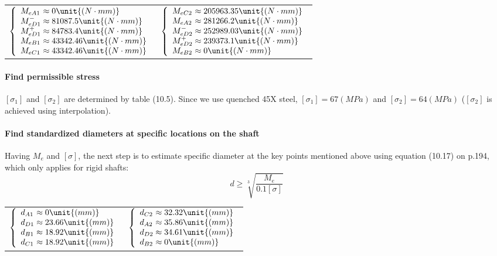 \begin{tabular}{p{7cm}p{7cm}}
	$
	\left\{ 
	\begin{array}{l@{{} \approx {}}l}
	M_{eA1} & 0 \unit{(N\cdot mm)}\\
	M_{eD1}^- & 81087.5 \unit{(N\cdot mm)}\\
	M_{eD1}^+ & 84783.4 \unit{(N\cdot mm)}\\
	M_{eB1} & 43342.46 \unit{(N\cdot mm)}\\
	M_{eC1} & 43342.46 \unit{(N\cdot mm)}\\
	\end{array}
	\right.
	$ &
	$
	\left\{ 
	\begin{array}{l@{{} \approx {}}l}
	M_{eC2} & 205963.35 \unit{(N\cdot mm)}\\
	M_{eA2} & 281266.2 \unit{(N\cdot mm)}\\
	M_{eD2}^- & 252989.03 \unit{(N\cdot mm)}\\
	M_{eD2}^+ & 239373.1 \unit{(N\cdot mm)}\\
	M_{eB2} & 0 \unit{(N\cdot mm)}\\
	\end{array}
	\right.
	$
\end{tabular}\vskip2mm

\paragraph{Find permissible stress}
$ [\sigma_1] $ and $ [\sigma_2] $ are determined by table (10.5). Since we use quenched 45X steel, $ [\sigma_1] = 67 \unit{(MPa)}$ and $ [\sigma_2] = 64 \unit{(MPa)}$ ($ [\sigma_2] $ is achieved using interpolation).

\paragraph{Find standardized diameters at specific locations on the shaft} Having $ M_e $ and $ [\sigma] $, the next step is to estimate specific diameter at the key points mentioned above using equation (10.17) on p.194, which only applies for rigid shafts:
\[d \geq \sqrt[3]{\dfrac{M_e}{0.1[\sigma]}}\]

\begin{tabular}{p{7cm}p{7cm}}
	$
	\left\{ 
	\begin{array}{l@{{} \approx {}}l}
	d_{A1} & 0 \unit{(mm)}\\
	d_{D1} & 23.66 \unit{(mm)}\\
	d_{B1} & 18.92 \unit{(mm)}\\
	d_{C1} & 18.92 \unit{(mm)}\\
	\end{array}
	\right.
	$ &
	$
	\left\{ 
	\begin{array}{l@{{} \approx {}}l}
	d_{C2} & 32.32 \unit{(mm)}\\
	d_{A2} & 35.86 \unit{(mm)}\\
	d_{D2} & 34.61 \unit{(mm)}\\
	d_{B2} & 0\unit{(mm)}\\
	\end{array}
	\right.
	$
\end{tabular}

